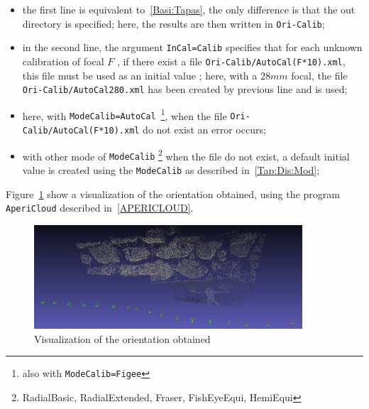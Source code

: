 \begin{itemize}
   \item the first line is equivalent to~\ref{Basi:Tapas}, the only difference
         is that the out directory is specified; here, the results are  then written
         in {\tt Ori-Calib};
  

   \item in the second line, the argument {\tt InCal=Calib} specifies that for each
         unknown calibration of focal $F$ , if there exist a file {\tt Ori-Calib/AutoCal(F*10).xml},
         this file must be used as an initial value ; here, with a $28mm$ focal, 
         the file {\tt Ori-Calib/AutoCal280.xml} has been created by previous line
         and is used;

    \item  here, with {\tt  ModeCalib=AutoCal}~\footnote{also with {\tt ModeCalib=Figee}},
            when the file  {\tt Ori-Calib/AutoCal(F*10).xml} do not exist an error occurs;
           

    \item  with other mode of {\tt ModeCalib}
           \footnote{RadialBasic, RadialExtended, Fraser, FishEyeEqui, HemiEqui}
            when the file do not exist, a default initial value is created using
            the {\tt ModeCalib}  as described in~\ref{Tap:Dis:Mod};
\end{itemize}


Figure~\ref{FIG:StM:OriMur} show a visualization of the orientation obtained, using
the program {\tt AperiCloud} described in~\ref{APERICLOUD}.

\begin{figure}
\begin{center}
\includegraphics[width=100mm]{FIGS/MurSaintMartin/AperiCloudSnap00.jpg}
\end{center}
\caption{Visualization of the orientation obtained }
\label{FIG:StM:OriMur}
\end{figure}


